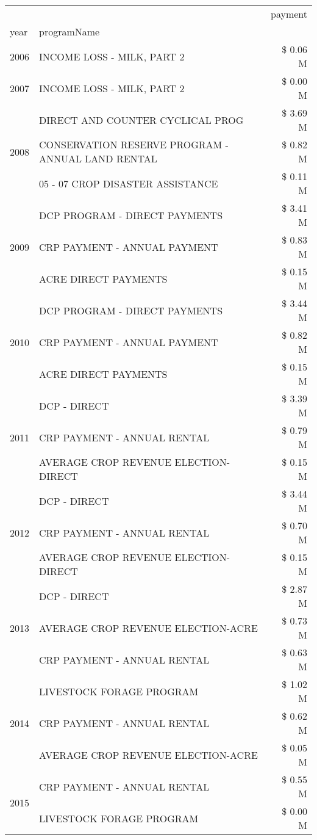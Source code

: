 \begin{tabular}{llr}
\toprule
 &  & payment \\
year & programName &  \\
\midrule
2006 & INCOME LOSS - MILK, PART 2 & \$ 0.06 M \\
\cline{1-3}
2007 & INCOME LOSS - MILK, PART 2 & \$ 0.00 M \\
\cline{1-3}
\multirow[t]{3}{*}{2008} & DIRECT AND COUNTER CYCLICAL PROG & \$ 3.69 M \\
 & CONSERVATION RESERVE PROGRAM - ANNUAL LAND RENTAL & \$ 0.82 M \\
 & 05 - 07 CROP DISASTER ASSISTANCE & \$ 0.11 M \\
\cline{1-3}
\multirow[t]{3}{*}{2009} & DCP PROGRAM - DIRECT PAYMENTS & \$ 3.41 M \\
 & CRP PAYMENT - ANNUAL PAYMENT & \$ 0.83 M \\
 & ACRE DIRECT PAYMENTS & \$ 0.15 M \\
\cline{1-3}
\multirow[t]{3}{*}{2010} & DCP PROGRAM - DIRECT PAYMENTS & \$ 3.44 M \\
 & CRP PAYMENT - ANNUAL PAYMENT & \$ 0.82 M \\
 & ACRE DIRECT PAYMENTS & \$ 0.15 M \\
\cline{1-3}
\multirow[t]{3}{*}{2011} & DCP - DIRECT & \$ 3.39 M \\
 & CRP PAYMENT - ANNUAL RENTAL & \$ 0.79 M \\
 & AVERAGE CROP REVENUE ELECTION-DIRECT & \$ 0.15 M \\
\cline{1-3}
\multirow[t]{3}{*}{2012} & DCP - DIRECT & \$ 3.44 M \\
 & CRP PAYMENT - ANNUAL RENTAL & \$ 0.70 M \\
 & AVERAGE CROP REVENUE ELECTION-DIRECT & \$ 0.15 M \\
\cline{1-3}
\multirow[t]{3}{*}{2013} & DCP - DIRECT & \$ 2.87 M \\
 & AVERAGE CROP REVENUE ELECTION-ACRE & \$ 0.73 M \\
 & CRP PAYMENT - ANNUAL RENTAL & \$ 0.63 M \\
\cline{1-3}
\multirow[t]{3}{*}{2014} & LIVESTOCK FORAGE PROGRAM & \$ 1.02 M \\
 & CRP PAYMENT - ANNUAL RENTAL & \$ 0.62 M \\
 & AVERAGE CROP REVENUE ELECTION-ACRE & \$ 0.05 M \\
\cline{1-3}
\multirow[t]{3}{*}{2015} & CRP PAYMENT - ANNUAL RENTAL & \$ 0.55 M \\
 & LIVESTOCK FORAGE PROGRAM & \$ 0.00 M \\

\end{tabular}
